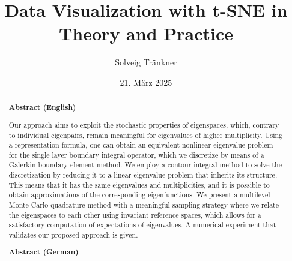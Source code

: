 \documentclass[paper=a4, fontsize=11pt, BCOR=13mm, DIV=13, headinclude, toc=index, toc=bibliography, english, twoside, parskip]{scrreprt}
\author{Solveig Tr\"ankner}
\date{21. M\"arz 2025}
\title{Data Visualization with t-SNE in Theory and Practice}
\theoremstyle{definition}               %
\theoremstyle{plain}
\begin{document}
\maketitle              %

\begin{abstract}
    \textbf{Abstract (English)}

    Our approach aims to exploit the stochastic properties of eigenspaces, which, contrary to individual eigenpairs, remain meaningful for eigenvalues of higher multiplicity.
    Using a representation formula, one can obtain an equivalent nonlinear eigenvalue problem for the single layer boundary integral operator, which we discretize by means of a Galerkin boundary element method.
    We employ a contour integral method to solve the discretization by reducing it to a linear eigenvalue problem that inherits its structure. This means that it has the same eigenvalues and multiplicities, and it is possible to obtain approximations of the corresponding eigenfunctions.
    We present a multilevel Monte Carlo quadrature method with a meaningful sampling strategy where we relate the eigenspaces to each other using invariant reference spaces, which allows for a satisfactory computation of expectations of eigenvalues.
    A numerical experiment that validates our proposed approach is given.


    \vspace{2em}
    \textbf{Abstract (German)}


\end{abstract}
\end{document}
